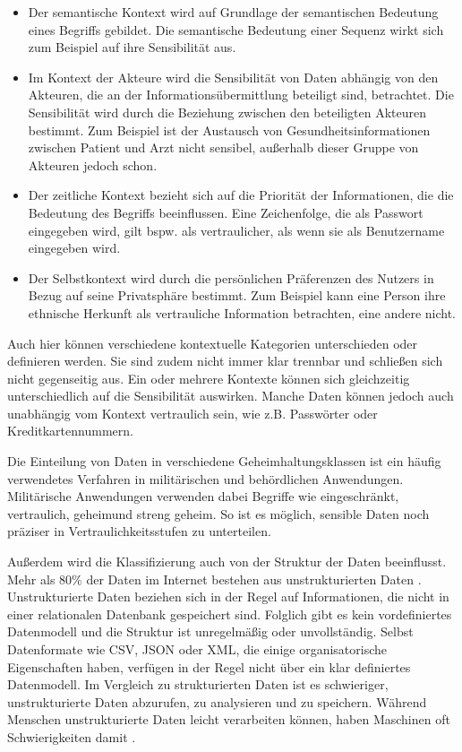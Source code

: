 \begin{itemize}
    \item Der semantische Kontext wird auf Grundlage der semantischen Bedeutung eines Begriffs gebildet. Die semantische Bedeutung einer Sequenz wirkt sich zum Beispiel auf ihre Sensibilität aus.
    \item Im Kontext der Akteure wird die Sensibilität von Daten abhängig von den Akteuren, die an der Informationsübermittlung beteiligt sind, betrachtet. Die Sensibilität wird durch die Beziehung zwischen den beteiligten Akteuren bestimmt. Zum Beispiel ist der Austausch von Gesundheitsinformationen zwischen Patient und Arzt nicht sensibel, außerhalb dieser Gruppe von Akteuren jedoch schon.
    \item Der zeitliche Kontext bezieht sich auf die Priorität der Informationen, die die Bedeutung des Begriffs beeinflussen. Eine Zeichenfolge, die als Passwort eingegeben wird, gilt bspw. als vertraulicher, als wenn sie als Benutzername eingegeben wird.
    \item Der Selbstkontext wird durch die persönlichen Präferenzen des Nutzers in Bezug auf seine Privatsphäre bestimmt. Zum Beispiel kann eine Person ihre ethnische Herkunft als vertrauliche Information betrachten, eine andere nicht.
\end{itemize}
Auch hier können verschiedene kontextuelle Kategorien unterschieden oder definieren werden. Sie sind zudem nicht immer klar trennbar und schließen sich nicht gegenseitig aus. Ein oder mehrere Kontexte können sich gleichzeitig unterschiedlich auf die Sensibilität auswirken. Manche Daten können jedoch auch unabhängig vom Kontext vertraulich sein, wie z.B. Passwörter oder Kreditkartennummern.

Die Einteilung von Daten in verschiedene Geheimhaltungsklassen ist ein häufig verwendetes Verfahren in militärischen und behördlichen Anwendungen. Militärische Anwendungen verwenden dabei Begriffe wie \glqq eingeschränkt\grqq , \glqq vertraulich\grqq, \glqq geheim\grqq und \glqq streng geheim\grqq \cite{Landwehr.1984}. So ist es möglich, sensible Daten noch präziser in Vertraulichkeitsstufen zu unterteilen.

Außerdem wird die Klassifizierung auch von der Struktur der Daten beeinflusst. Mehr als 80\% der Daten im Internet bestehen aus unstrukturierten Daten \cite{Allahyari.2017}. Unstrukturierte Daten beziehen sich in der Regel auf Informationen, die nicht in einer relationalen Datenbank gespeichert sind. Folglich gibt es kein vordefiniertes Datenmodell und die Struktur ist unregelmäßig oder unvollständig. Selbst Datenformate wie CSV, JSON oder XML, die einige organisatorische Eigenschaften haben, verfügen in der Regel nicht über ein klar definiertes Datenmodell. Im Vergleich zu strukturierten Daten ist es schwieriger, unstrukturierte Daten abzurufen, zu analysieren und zu speichern. Während Menschen unstrukturierte Daten leicht verarbeiten können, haben Maschinen oft Schwierigkeiten damit \cite{Guo.2021}.

